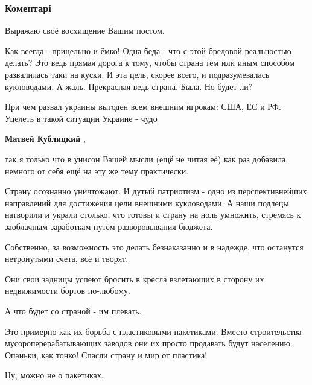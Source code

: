  
 
 
 
 
\subsubsection{Коментарі}

\begin{itemize} %
Выражаю своё восхищение Вашим постом.

Как всегда - прицельно и ёмко!
Одна беда - что с этой бредовой реальностью делать?
Это ведь прямая дорога к тому, чтобы страна тем или иным способом развалилась таки на куски. И эта цель, скорее всего, и подразумевалась кукловодами.
А жаль.
Прекрасная ведь страна. Была. Но будет ли?

\begin{itemize} %
При чем развал украины выгоден всем внешним игрокам: США, ЕС и РФ. Уцелеть в такой ситуации Украине - чудо

\textbf{Матвей Кублицкий} , 

так я только что в унисон Вашей мысли (ещё не читая её) как раз добавила
немного от себя ещё на эту же тему практически.

Страну осознанно уничтожают. И дутый патриотизм - одно из перспективнейших
направлений для достижения цели внешними кукловодами. А наши подлецы натворили
и украли столько, что готовы и страну на ноль умножить, стремясь к заоблачным
заработкам путём разворовывания бюджета.

Собственно, за возможность это делать безнаказанно и в надежде, что останутся
нетронутыми счета, всё и творят.

Они свои задницы успеют бросить в кресла взлетающих в сторону их недвижимости
бортов по-любому.

А что будет со страной - им плевать.

Это примерно как их борьба с пластиковыми пакетиками. Вместо строительства
мусороперерабатывающих заводов они их просто продавать будут населению.
Опаньки, как тонко! Спасли страну и мир от пластика!

Ну, можно не о пакетиках.


\end{itemize}
\end{itemize}
